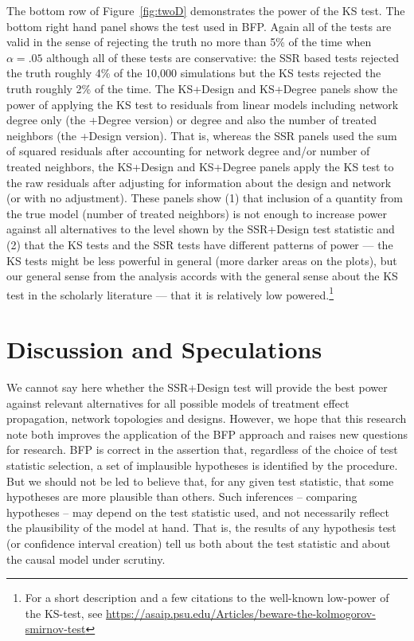 The bottom row of Figure~\ref{fig:twoD} demonstrates the power of the KS test.
The bottom right hand panel shows the test used in BFP. Again all of the tests
are valid in the sense of rejecting the truth no more than 5\% of the time
when $\alpha=.05$ although all of these tests are conservative: the SSR based
tests rejected the truth roughly 4\% of the 10,000 simulations but the KS
tests rejected the truth roughly 2\% of the time.  The KS+Design and KS+Degree
panels show the power of applying the KS test to residuals from linear models
including network degree only (the +Degree version) or degree and also the
number of treated neighbors (the +Design version). That is, whereas the SSR
panels used the sum of squared residuals after accounting for network degree
and/or number of treated neighbors, the KS+Design and KS+Degree panels apply
the KS test to the raw residuals after adjusting for information about the
design and network (or with no adjustment). These panels show (1) that
inclusion of a quantity from the true model (number of treated neighbors) is
not enough to increase power against all alternatives to the level shown by
the SSR+Design test statistic and (2) that the KS tests and the SSR tests have
different patterns of power --- the KS tests might be less powerful in general
(more darker areas on the plots), but our general sense from the analysis
accords with the general sense about the KS test in the scholarly literature
--- that it is relatively low powered.\footnote{For a short description and a
few citations to the well-known low-power of the KS-test, see
\url{https://asaip.psu.edu/Articles/beware-the-kolmogorov-smirnov-test}}

\section{Discussion and Speculations}

We cannot say here whether the SSR+Design test will provide the best power
against relevant alternatives for all possible models of treatment effect
propagation, network topologies and designs. However, we hope that this
research note both improves the application of the BFP approach and raises new
questions for research.  BFP is correct in the assertion that, regardless of
the choice of test statistic selection, a set of implausible hypotheses is
identified by the procedure. But we should not be led to believe that, for any
given test statistic, that some hypotheses are more plausible than others.
Such inferences -- comparing hypotheses -- may depend on the test statistic
used, and not necessarily reflect the plausibility of the model at hand. That
is, the results of any hypothesis test (or confidence interval creation) tell
us both about the test statistic and about the causal model under scrutiny.


